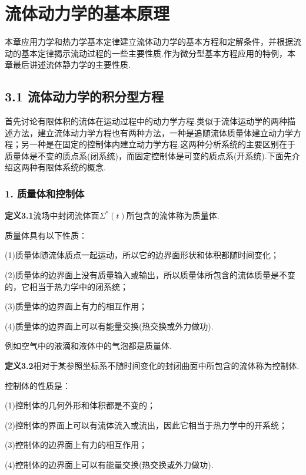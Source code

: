 \chapter{流体动力学的基本原理}

本章应用力学和热力学基本定律建立流体动力学的基本方程和定解条件，并根据流动的基本定律揭示流动过程的一些主要性质.作为微分型基本方程应用的特例，本章最后讲述流体静力学的主要性质.

\section*{3.1  流体动力学的积分型方程}

首先讨论有限体积的流体在运动过程中的动力学方程.类似于流体运动学的两种描述方法，建立流体动力学方程也有两种方法，一种是追随流体质量体建立动力学方程；另一种是在固定的控制体内建立动力学方程.这两种分析系统的主要区别在于质量体是不变的质点系(闭系统)，而固定控制体是可变的质点系(开系统).下面先介绍这两种有限体系统的概念.

\subsection*{1. 质量体和控制体}

\noindent\textbf{定义3.1}\quad 流场中封闭流体面$\Sigma^{*}(t)$所包含的流体称为质量体.

质量体具有以下性质：

(1)质量体随流体质点一起运动，所以它的边界面形状和体积都随时间变化；

(2)质量体的边界面上没有质量输入或输出，所以质量体所包含的流体质量是不变的，它相当于热力学中的闭系统；

(3)质量体的边界面上有力的相互作用；

(4)质量体的边界面上可以有能量交换(热交换或外力做功).

例如空气中的液滴和液体中的气泡都是质量体.

\noindent\textbf{定义3.2}\quad 相对于某参照坐标系不随时间变化的封闭曲面中所包含的流体称为控制体.

控制体的性质是：

(1)控制体的几何外形和体积都是不变的；

(2)控制体的界面上可以有流体流入或流出，因此它相当于热力学中的开系统；

(3)控制体的边界面上有力的相互作用；

(4)控制体的边界面上可以有能量交换(热交换或外力做功).

